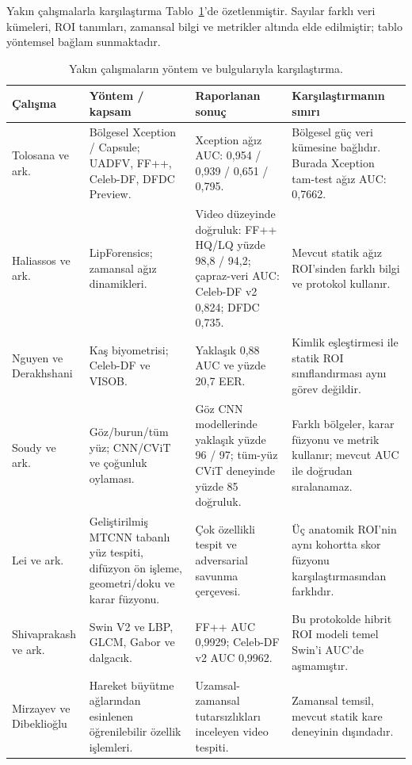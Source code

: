 \documentclass[a4paper]{elektr}
\begin{document}
Yakın çalışmalarla karşılaştırma Tablo~\ref{tab:literature}'de özetlenmiştir. Sayılar farklı veri kümeleri, ROI tanımları, zamansal bilgi ve metrikler altında elde edilmiştir; tablo yöntemsel bağlam sunmaktadır.
\begin{table}[!htbp]\centering\begin{minipage}{15.8cm}
\caption{Yakın çalışmaların yöntem ve bulgularıyla karşılaştırma.}\label{tab:literature}
\centering \small
\begin{tabular}{>{\raggedright\arraybackslash}p{2.2cm}>{\raggedright\arraybackslash}p{3.0cm}>{\raggedright\arraybackslash}p{4.1cm}>{\raggedright\arraybackslash}p{4.1cm}}\toprule
Çalışma & Yöntem / kapsam & Raporlanan sonuç & Karşılaştırmanın sınırı \\\midrule
Tolosana ve ark. \cite{tolosana} & Bölgesel Xception / Capsule; UADFV, FF++, Celeb-DF, DFDC Preview. & Xception ağız AUC: 0,954 / 0,939 / 0,651 / 0,795. & Bölgesel güç veri kümesine bağlıdır. Burada Xception tam-test ağız AUC: 0,7662. \\
Haliassos ve ark. \cite{haliassos} & LipForensics; zamansal ağız dinamikleri. & Video düzeyinde doğruluk: FF++ HQ/LQ yüzde 98,8 / 94,2; çapraz-veri AUC: Celeb-DF v2 0,824; DFDC 0,735. & Mevcut statik ağız ROI’sinden farklı bilgi ve protokol kullanır. \\
Nguyen ve Derakhshani \cite{nguyen} & Kaş biyometrisi; Celeb-DF ve VISOB. & Yaklaşık 0,88 AUC ve yüzde 20,7 EER. & Kimlik eşleştirmesi ile statik ROI sınıflandırması aynı görev değildir. \\
Soudy ve ark. \cite{soudy} & Göz/burun/tüm yüz; CNN/CViT ve çoğunluk oylaması. & Göz CNN modellerinde yaklaşık yüzde 96 / 97; tüm-yüz CViT deneyinde yüzde 85 doğruluk. & Farklı bölgeler, karar füzyonu ve metrik kullanır; mevcut AUC ile doğrudan sıralanamaz. \\
Lei ve ark. \cite{lei} & Geliştirilmiş MTCNN tabanlı yüz tespiti, difüzyon ön işleme, geometri/doku ve karar füzyonu. & Çok özellikli tespit ve adversarial savunma çerçevesi. & Üç anatomik ROI’nin aynı kohortta skor füzyonu karşılaştırmasından farklıdır. \\
Shivaprakash ve ark. \cite{shivaprakash} & Swin V2 ve LBP, GLCM, Gabor ve dalgacık. & FF++ AUC 0,9929; Celeb-DF v2 AUC 0,9962. & Bu protokolde hibrit ROI modeli temel Swin’i AUC’de aşmamıştır. \\
Mirzayev ve Dibeklioğlu \cite{mirzayev} & Hareket büyütme ağlarından esinlenen öğrenilebilir özellik işlemleri. & Uzamsal-zamansal tutarsızlıkları inceleyen video tespiti. & Zamansal temsil, mevcut statik kare deneyinin dışındadır. \\

\end{tabular}
\end{minipage}
\end{table}
\end{document}
